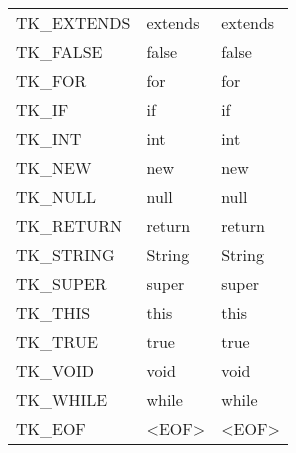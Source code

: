 \documentclass [a4paper,titlepage]{report}
\begin{document}
\begin{longtable}{l | l | l}
TK\_EXTENDS          & extends                                                               & extends                           \tabularnewline
TK\_FALSE            & false                                                                 & false                             \tabularnewline
TK\_FOR              & for                                                                   & for                               \tabularnewline
TK\_IF               & if                                                                    & if                                \tabularnewline
TK\_INT              & int                                                                   & int                               \tabularnewline
TK\_NEW              & new                                                                   & new                               \tabularnewline
TK\_NULL             & null                                                                  & null                              \tabularnewline
TK\_RETURN           & return                                                                & return                            \tabularnewline
TK\_STRING           & String                                                                & String                            \tabularnewline
TK\_SUPER            & super                                                                 & super                             \tabularnewline
TK\_THIS             & this                                                                  & this                              \tabularnewline
TK\_TRUE             & true                                                                  & true                              \tabularnewline
TK\_VOID             & void                                                                  & void                              \tabularnewline
TK\_WHILE            & while                                                                 & while                             \tabularnewline
TK\_EOF              & \textless{}EOF\textgreater{}                                          & \textless{}EOF\textgreater{}      \tabularnewline
\end{longtable}


\end{document}
